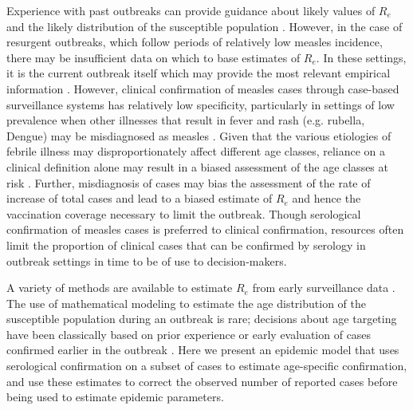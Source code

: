 Experience with past outbreaks can provide guidance about likely values of \(R_{e}\) \cite{Durrheim_2014} and the likely distribution of the susceptible population \cite{Goodson_2011, 25803382}. However, in the case of resurgent outbreaks, which follow periods of relatively low measles incidence, there may be insufficient data on which to base estimates of \(R_e\). In these settings, it is the current outbreak itself which may provide the most relevant empirical information \cite{Durrheim_2014, Merl_2009, Shea_2014}. However, clinical confirmation of measles cases through case-based surveillance systems has relatively low specificity, particularly in settings of low prevalence \cite{Hutchins_2004,Ho_2014,GUY_2004,31c964} when other illnesses that result in fever and rash (e.g. rubella, Dengue) may be misdiagnosed as measles \cite{Ho_2014}. Given that the various etiologies of febrile illness may disproportionately affect different age classes, reliance on a clinical definition alone may result in a biased assessment of the age classes at risk \cite{Hutchins_2004,Durrheim_2014}. Further, misdiagnosis of cases may bias the assessment of the rate of increase of total cases and lead to a biased estimate of \(R_{e}\) and hence the vaccination coverage necessary to limit the outbreak. Though serological confirmation of measles cases is preferred to clinical confirmation, resources often limit the proportion of clinical cases that can be confirmed by serology in outbreak settings in time to be of use to decision-makers. 

A variety of methods are available to estimate \(R_{e}\) from early surveillance data \cite{Durrheim_2014,Chiew_2013,Ferrari_2005,Lipsitch_2003}. The use of mathematical modeling to estimate the age distribution of the susceptible population during an outbreak is rare; decisions about age targeting have been classically based on prior experience or early evaluation of cases confirmed earlier in the outbreak \cite{Minetti_2013a}. Here we present an epidemic model that uses serological confirmation on a subset of cases to estimate age-specific confirmation, and use these estimates to correct the observed number of reported cases before being used to estimate epidemic parameters.

